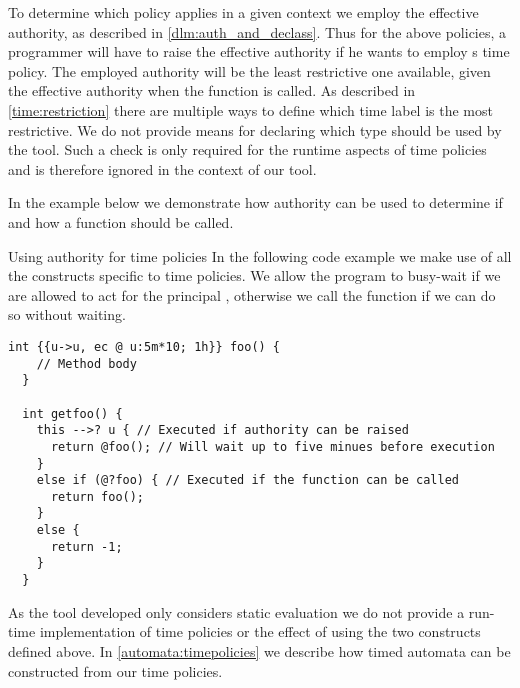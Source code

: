 To determine which policy applies in a given context we employ the effective authority, as described in \cref{dlm:auth_and_declass}.
Thus for the above policies, a programmer will have to raise the effective authority if he wants to employ s time policy.
The employed authority will be the least restrictive one available, given the effective authority when the function is called.
As described in \cref{time:restriction} there are multiple ways to define which time label is the most restrictive.
We do not provide means for declaring which type should be used by the tool.
Such a check is only required for the runtime aspects of time policies and is therefore ignored in the context of our tool.

In the example below we demonstrate how authority can be used to determine if and how a function should be called.

\begin{minipage}{\linewidth}
\begin{example}{Using authority for time policies}
In the following code example we make use of all the constructs specific to time policies.
We allow the program to busy-wait if we are allowed to act for the principal , otherwise we call the function  if we can do so without waiting.
\begin{lstlisting}[style=dlmc]
  int {{u->u, ec @ u:5m*10; 1h}} foo() {
    // Method body
  }
  
  int getfoo() {
    this -->? u { // Executed if authority can be raised
      return @foo(); // Will wait up to five minues before execution
    }
    else if (@?foo) { // Executed if the function can be called
      return foo();
    }
    else {
      return -1;
    }
  }
\end{lstlisting}
\end{example}
\end{minipage}


As the tool developed only considers static evaluation we do not provide a run-time implementation of time policies or the effect of using the two constructs defined above.
In \cref{automata:timepolicies} we describe how timed automata can be constructed from our time policies.
